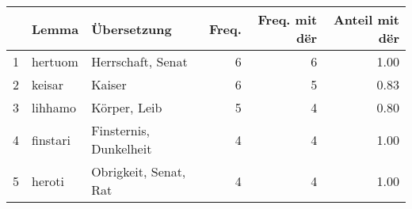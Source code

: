 \begin{tabular}{rllrrr}
  \hline
 & Lemma & Übersetzung & Freq. & Freq. mit dër & Anteil mit dër \\ 
  \hline
1 & hertuom & Herrschaft, Senat &   6 &   6 & 1.00 \\ 
  2 & keisar & Kaiser &   6 &   5 & 0.83 \\ 
  3 & lihhamo & Körper, Leib &   5 &   4 & 0.80 \\ 
  4 & finstari & Finsternis, Dunkelheit &   4 &   4 & 1.00 \\ 
  5 & heroti & Obrigkeit, Senat, Rat &   4 &   4 & 1.00 \\ 
   \hline
\end{tabular}
